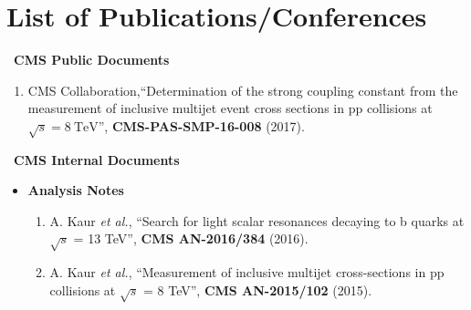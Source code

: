 \chapter*{List of Publications/Conferences} %
\markboth{}{}
\fontsize{11pt}{12pt} \selectfont
\begin{itemize}
{\Large \item {\bf ~CMS Public Documents}}
\begin{enumerate}

\item CMS Collaboration,``Determination of the strong coupling constant from the measurement of inclusive multijet event cross sections in pp collisions at $\sqrt{s} = 8~\mathrm{TeV}$'', {\bf CMS-PAS-SMP-16-008} (2017).

\end{enumerate}

\vspace*{3mm}

{\Large \item {\bf ~CMS Internal Documents}}
\begin{itemize}
\item {\large \bf Analysis Notes} 
\begin{enumerate}

\item A. Kaur {\it et al.}, ``Search for light scalar resonances decaying to b quarks at $\sqrt{s}$ = 13 TeV'', {\bf CMS AN-2016/384} (2016).

\item A. Kaur {\it et al.}, ``Measurement of inclusive multijet cross-sections in pp collisions at $\sqrt{s}$ = 8 TeV'', {\bf CMS AN-2015/102} (2015).


\end{enumerate}
\end{itemize}
\end{itemize}
